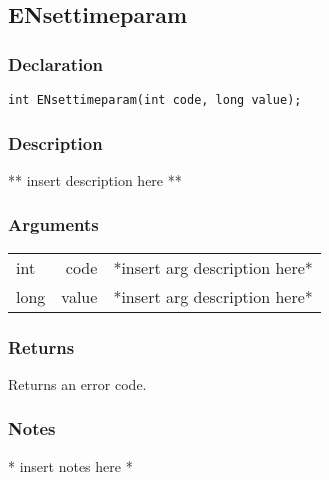 \subsection{ENsettimeparam}
\subsubsection{Declaration}
\begin{lstlisting}
int ENsettimeparam(int code, long value);
\end{lstlisting}
\subsubsection{Description}
** insert description here **
\subsubsection{Arguments}
\begin{tabular}{l r p{11cm} }
int&code&*insert arg description here* \\[6pt]
long&value&*insert arg description here* \\[6pt]
\end{tabular}
\subsubsection{Returns}
Returns an error code.
\subsubsection{Notes}
* insert notes here *